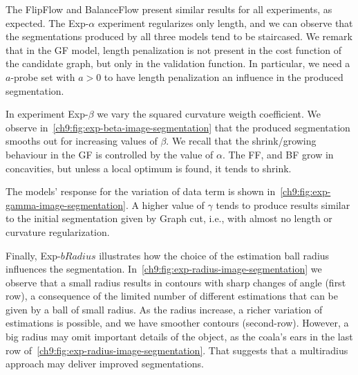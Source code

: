 The FlipFlow and BalanceFlow present similar results for all experiments, as expected. The Exp-$\alpha$ experiment regularizes only length, and we can observe that the segmentations produced by all three models tend to be staircased. We remark that in the GF model, length penalization is not present in the cost function of the candidate graph, but only in the validation function. In particular, we need  a $a$-probe set with $a>0$ to have length penalization an influence in the produced segmentation.

In experiment Exp-$\beta$ we vary the squared curvature weigth coefficient. We observe in~\cref{ch9:fig:exp-beta-image-segmentation} that the produced segmentation smooths out for increasing values of $\beta$. We recall that the shrink/growing behaviour in the GF is controlled by the value of $\alpha$. The FF, and BF grow in concavities, but unless a local optimum is found, it tends to shrink.

The models' response for the variation of data term is shown in~\cref{ch9:fig:exp-gamma-image-segmentation}. A higher value of $\gamma$ tends to produce results similar to the initial segmentation given by Graph cut, i.e., with almost no length or curvature regularization.

Finally, Exp-$bRadius$ illustrates how the choice of the estimation ball radius influences the segmentation. In~\cref{ch9:fig:exp-radius-image-segmentation} we observe that a small radius results in contours with sharp changes of angle (first row), a consequence of the limited number of different estimations that can be given by a ball of small radius. As the radius increase, a richer variation of estimations is possible, and we have smoother contours (second-row). However, a big radius may omit important details of the object, as the coala's ears in the last row of~\cref{ch9:fig:exp-radius-image-segmentation}. That suggests that a multiradius approach may deliver improved segmentations.


